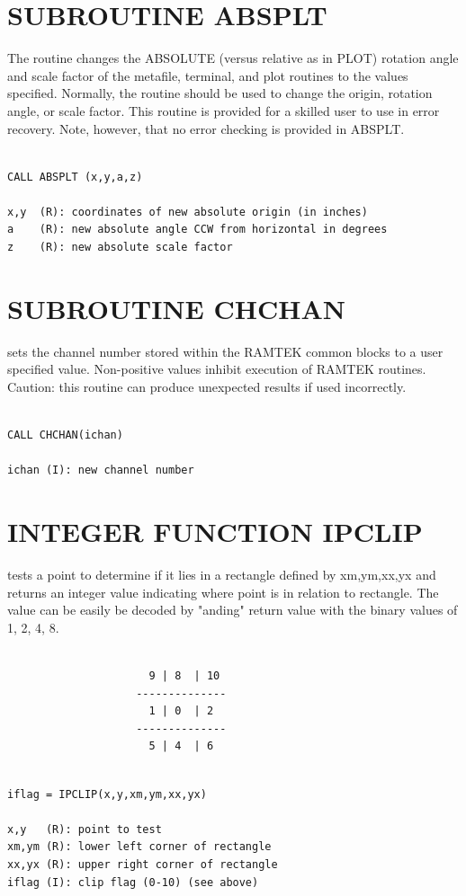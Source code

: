 \documentclass[11pt]{report}
\begin{document}
\section{SUBROUTINE ABSPLT}

The routine  changes the ABSOLUTE (versus relative as in PLOT)
rotation angle and scale factor of the metafile, terminal, and 
plot routines to the values specified.  Normally, the routine  should be
used to change the origin, rotation angle, or scale factor.  This routine
is provided for a skilled user to use in error recovery.  Note, however,
that no error checking is provided in ABSPLT.
\begin{verbatim}

CALL ABSPLT (x,y,a,z)

x,y  (R): coordinates of new absolute origin (in inches)
a    (R): new absolute angle CCW from horizontal in degrees
z    (R): new absolute scale factor
\end{verbatim}


\section{SUBROUTINE CHCHAN}

 sets the channel number stored within the RAMTEK common blocks
to a user specified value.  Non-positive values inhibit execution of RAMTEK
routines.  Caution: this routine can produce unexpected results if used
incorrectly.
\begin{verbatim}

CALL CHCHAN(ichan)

ichan (I): new channel number
\end{verbatim}

\section{INTEGER FUNCTION IPCLIP}

 tests a point to determine if it lies in a rectangle defined by
xm,ym,xx,yx and returns an integer value indicating where point is in relation
to rectangle.  The value can be easily be decoded by "anding" return
value with the binary values of 1, 2, 4, 8.
\begin{verbatim}

                      9 | 8  | 10
                    --------------
                      1 | 0  | 2
                    --------------
                      5 | 4  | 6
\end{verbatim}
\begin{verbatim}

iflag = IPCLIP(x,y,xm,ym,xx,yx)

x,y   (R): point to test
xm,ym (R): lower left corner of rectangle
xx,yx (R): upper right corner of rectangle
iflag (I): clip flag (0-10) (see above)
\end{verbatim}
\end{document}
